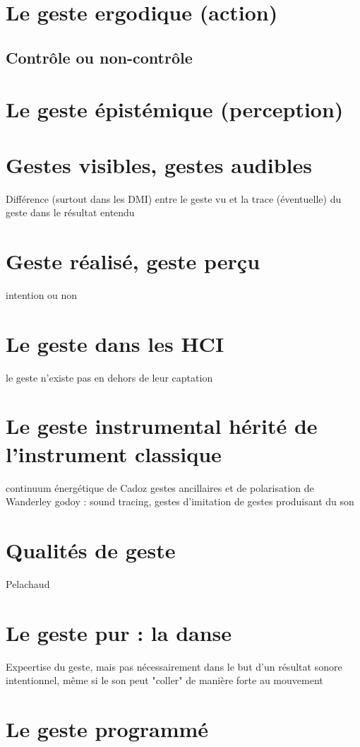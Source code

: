 \section{Le geste ergodique (action)}
\subsection{Contrôle ou non-contrôle}
\section{Le geste épistémique (perception)}


\section{Gestes visibles, gestes audibles}
Différence (surtout dans les DMI) entre le geste vu et la trace (éventuelle) du geste dans le résultat entendu

\section{Geste réalisé, geste perçu}
intention ou non


\section{Le geste dans les HCI}
	le geste n'existe pas en dehors de leur captation  

\section{Le geste instrumental hérité de l'instrument classique}
	continuum énergétique de Cadoz
	gestes ancillaires et de polarisation de Wanderley
	godoy : sound tracing, gestes d'imitation de gestes produisant du son

\section{Qualités de geste}
Pelachaud 

\section{Le geste pur : la danse}
Expeertise du geste, mais pas nécessairement dans le but d'un résultat sonore intentionnel, même si le son peut "coller" de manière forte au mouvement


\section{Le geste programmé}


